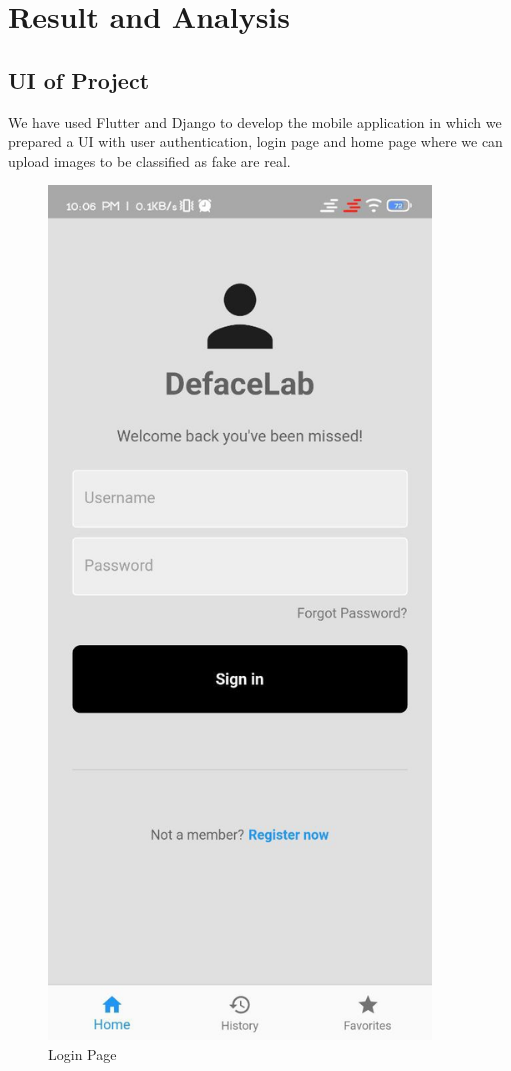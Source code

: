 \section{Result and Analysis}
\subsection{UI of Project}
We have used Flutter and Django to develop the mobile application in which we prepared a
UI with user authentication, login page and home page where we can upload images to be classified as fake are real.

\begin{figure}[h]
    \centering
    \includegraphics[width= 4in, height =7 in ]{img/loginpage.jpg}
    \caption{Login Page }
\end{figure}

